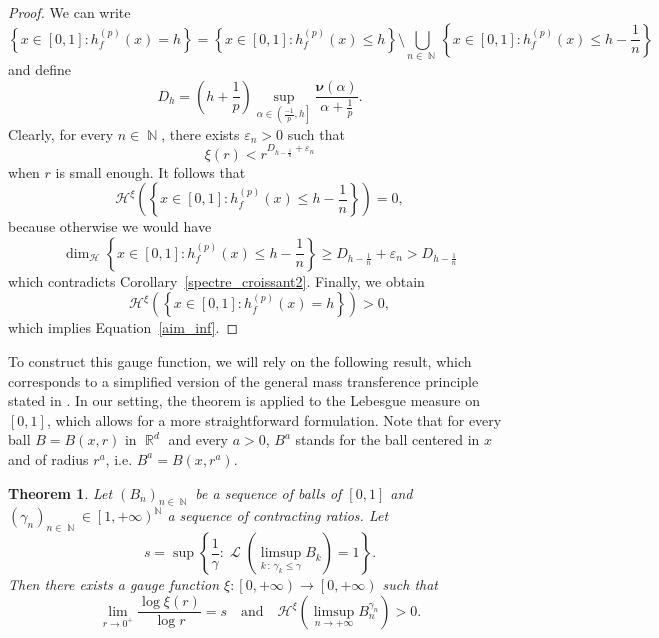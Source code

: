 \documentclass[a4paper,11pt,oneside]{article}
\DeclareMathOperator{\R}{\mathbb{R}}
\DeclareMathOperator{\N}{\mathbb{N}}
\DeclareMathOperator{\leb}{\mathcal{L}}
\newcommand{\coint}[1]{\left[{#1}\right)}
\newcommand{\ccint}[1]{\left[{#1}\right]}
\newcommand{\ocint}[1]{\left({#1}\right]}
\theoremstyle{definition}
\theoremstyle{plain}
\newtheorem{thm}[defi]{Theorem}
\begin{document}
\begin{proof}
We can write
\[
\left\{x\in\ccint{0,1}:h_f^{(p)}(x)=h\right\}
=\left\{x\in\ccint{0,1}:h_f^{(p)}(x)\leq h\right\}\setminus\bigcup_{n\in\N}\left\{x\in\ccint{0,1}:h_f^{(p)}(x)\leq h-\frac{1}{n}\right\}
\]
and define
\[
D_h=\left(h+\frac{1}{p}\right)\sup_{\alpha\in\ocint{\frac{-1}{p},h}}\frac{\bm{\nu}(\alpha)}{\alpha+\frac{1}{p}}.
\]
Clearly, for every $n\in\N$,
there exists $\varepsilon_n>0$ such that 
\[
\xi(r)<r^{D_{h-\frac{1}{n}}+\varepsilon_n}
\]
when $r$ is small enough. It follows that
\[
\mathcal{H}^\xi\left(\left\{x\in\ccint{0,1}:h_f^{(p)}(x)\leq h-\frac{1}{n}\right\}\right)=0,
\]
because otherwise we would have
\[
\dim_{\mathcal{H}}\left\{x\in\ccint{0,1}:h_f^{(p)}(x)\leq h-\frac{1}{n}\right\}\geq D_{h-\frac{1}{n}}+\varepsilon_n>D_{h-\frac{1}{n}}
\]
which contradicts Corollary~\ref{spectre_croissant2}. Finally, we obtain
\[
\mathcal{H}^\xi\left(\left\{x\in\ccint{0,1}:h_f^{(p)}(x)=h\right\}\right)
>0,
\]
which implies Equation~\eqref{aim_inf}.
\end{proof}


To construct this gauge function, we will rely on the following result, which corresponds to a simplified version of the general mass transference principle stated in \cite[Theorem 2.2]{edouard}. In our setting, the theorem is applied to the Lebesgue measure on $[0,1]$, which allows for a more straightforward formulation. Note that for every ball $B=B(x,r)$ in $\R^d$ and every $a>0$, $B^a$ stands for the ball centered in $x$ and of radius $r^a$, i.e. $B^a=B(x,r^a)$.

\begin{thm}\label{edouard}
Let $(B_n)_{n\in\N}$ be a sequence of balls of $\ccint{0,1}$ and $(\gamma_n)_{n\in\N}\in\coint{1,+\infty}^{\N}$ a sequence of contracting ratios. Let 
\[
s=\sup\left\{\frac{1}{\gamma}:\leb\left(\limsup_{k\,:\,\gamma_k\leq \gamma}B_k\right)=1\right\}.
\]
Then there exists a gauge function $\xi:\coint{0,+\infty}\rightarrow\coint{0,+\infty}$ such that
\[
\lim_{r\rightarrow0^+}\frac{\log\xi(r)}{\log r}=s \quad\text{and}\quad \mathcal{H}^\xi\left(\limsup_{n\rightarrow+\infty}B_n^{\gamma_n}\right)>0.
\]
\end{thm}
\end{document}
